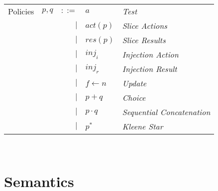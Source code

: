 \documentclass[12pt, letterpaper]{article}
\begin{document}
    \begin{tabular}{l c r l l}
        Policies    & $p,q$ & $::=$  & $a$              & \textit{Test}     \\
                    &       & $\mid$ & $act(p)$         & \textit{Slice Actions}    \\
                    &       & $\mid$ & $res(p)$         & \textit{Slice Results}    \\
                    &       & $\mid$ & $inj_{i}$        & \textit{Injection Action} \\
                    &       & $\mid$ & $inj_{r}$        & \textit{Injection Result} \\
                    &       & $\mid$ & $f \leftarrow n$ & \textit{Update}   \\
                    &       & $\mid$ & $p + q$          & \textit{Choice}   \\
                    &       & $\mid$ & $p \cdot q$      & \textit{Sequential Concatenation} \\
                    &       & $\mid$ & $p ^{*}$         & \textit{Kleene Star}
    \end{tabular}\\
\section{Semantics}
\end{document}
